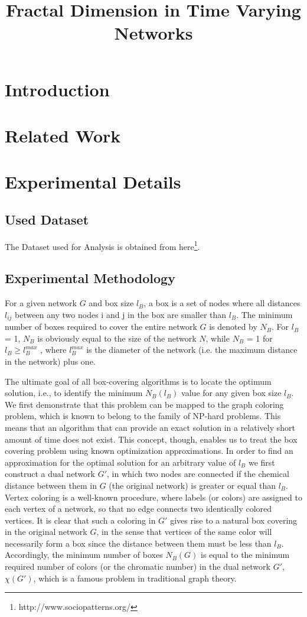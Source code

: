 \documentclass{article}
\title{Fractal Dimension in Time Varying Networks}
\begin{document}
\section{Introduction}

\section{Related Work}

\section{Experimental Details}


\subsection{Used Dataset}
The Dataset used for Analysis is obtained from here\footnote{http://www.sociopatterns.org/}.

\subsection{Experimental Methodology}
For a given network $G$ and box size $l_B$, a box is a set of nodes where all distances $l_{ij}$ between any two nodes i and j in the box are smaller than $l_B$. The minimum number of boxes required to cover the entire network $G$ is denoted by $N_B$. For $l_B$ = 1, $N_B$ is obviously equal to the size of the network $N$, while $N_B$ = 1 for $l_B \geq l_B^{max}$ , where $l_B^{max}$ is the diameter of the network (i.e. the maximum distance in the network) plus one.

The ultimate goal of all box-covering algorithms is to locate the optimum solution, i.e., to identify the minimum $N_B(l_B)$ value for any given box size $l_B$. We first demonstrate that this problem can be mapped to the graph coloring problem, which is known to belong to the family of NP-hard problems. This means that an algorithm that can provide an exact solution in a relatively short amount of time does not exist. This concept, though, enables us to treat the box covering problem using known optimization approximations. In order to find an approximation for the optimal
solution for an arbitrary value of $l_B$ we first construct a dual network $G'$, in which two
nodes are connected if the chemical distance between them in $G$ (the original network)
is greater or equal than $l_B$.
Vertex coloring is a well-known procedure, where labels (or colors) are assigned to
each vertex of a network, so that no edge connects two identically colored vertices. It
is clear that such a coloring in $G'$ gives rise to a natural box covering in the original
network $G$, in the sense that vertices of the same color will necessarily form a box since
the distance between them must be less than $l_B$. Accordingly, the minimum number
of boxes $N_B(G)$ is equal to the minimum required number of colors (or the chromatic
number) in the dual network $G'$, $\chi(G')$, which is a famous problem in traditional graph
theory.
\end{document}
